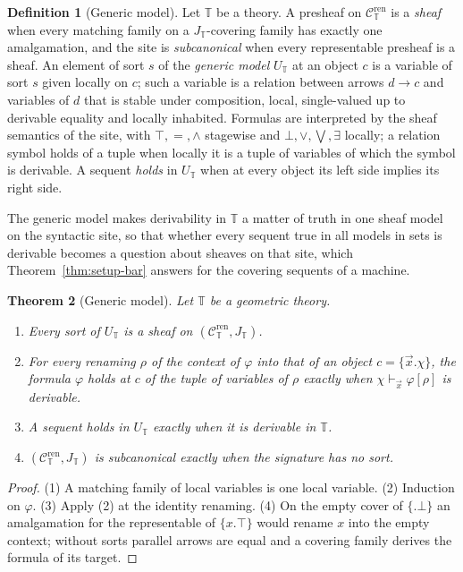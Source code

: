 \documentclass{lmcs}
\newtheorem{theorem}{Theorem}[section]
\theoremstyle{definition}
\newtheorem{definition}[theorem]{Definition}
\theoremstyle{remark}
\newcommand{\Tt}{\mathbb{T}}
\newcommand{\Der}{\vdash}
\newcommand{\Csyn}[1]{\mathcal{C}^{\mathrm{ren}}_{#1}}
\newcommand{\Jsyn}[1]{J_{#1}}
\begin{document}
\begin{definition}[Generic model]\label{def:generic}
Let $\Tt$ be a theory. A presheaf on $\Csyn{\Tt}$ is a \emph{sheaf} when every matching family on a
$\Jsyn{\Tt}$-covering family has exactly one amalgamation, and the site is \emph{subcanonical} when every
representable presheaf is a sheaf. An element of sort $s$ of the \emph{generic model} $U_{\Tt}$ at an object $c$
is a variable of sort $s$ given locally on $c$; such a variable is a relation between arrows $d\to c$ and variables of $d$
that is stable under composition, local, single-valued up to derivable equality and locally inhabited. Formulas
are interpreted by the sheaf semantics of the site, with $\top,=,\wedge$ stagewise and
$\bot,\vee,\bigvee,\exists$ locally; a relation symbol holds of a tuple when locally it is a tuple of
variables of which the symbol is derivable. A sequent \emph{holds} in $U_{\Tt}$ when at every object its left side
implies its right side.
\end{definition}

The generic model makes derivability in $\Tt$ a matter of truth in one sheaf model on the syntactic site, so that
whether every sequent true in all models in sets is derivable becomes a question about sheaves on that site, which
Theorem~\ref{thm:setup-bar} answers for the covering sequents of a machine.

\begin{theorem}[Generic model]\label{thm:generic}
Let $\Tt$ be a geometric theory.
\begin{enumerate}
\item Every sort of $U_{\Tt}$ is a sheaf on $(\Csyn{\Tt},\Jsyn{\Tt})$.
\item For every renaming $\rho$ of the context of $\varphi$ into that of an object $c=\{\vec x.\chi\}$, the formula
  $\varphi$ holds at $c$ of the tuple of variables of $\rho$ exactly when $\chi\Der_{\vec x}\varphi[\rho]$ is
  derivable.
\item A sequent holds in $U_{\Tt}$ exactly when it is derivable in $\Tt$.
\item $(\Csyn{\Tt},\Jsyn{\Tt})$ is subcanonical exactly when the signature has no
  sort.
\end{enumerate}
\end{theorem}

\begin{proof}
(1) A matching family of local variables is one local variable.
(2) Induction on $\varphi$.
(3) Apply (2) at the identity renaming. (4) On the empty cover of $\{.\bot\}$ an
amalgamation for the representable of $\{x.\top\}$ would rename $x$ into the empty
context; without sorts parallel arrows are equal and a covering family derives the
formula of its target.
\end{proof}
\end{document}
